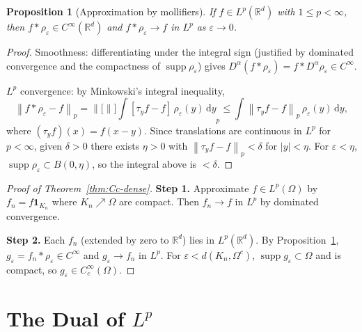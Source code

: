 \documentclass[a4paper,12pt]{book}
\DeclareMathOperator{\supp}{supp}
\newcommand{\R}{\mathbb{R}}
\newcommand{\dd}{\mathrm{d}}
\newcommand{\norm}[1]{\left\| #1 \right\|}
\newcommand{\abs}[1]{\left| #1 \right|}
\theoremstyle{definition}
\theoremstyle{plain}
\newtheorem{proposition}[definition]{Proposition}
\theoremstyle{remark}
\begin{document}
\begin{proposition}[Approximation by mollifiers]\label{prop:mollifier-approx}
If $f \in L^p(\R^d)$ with $1 \le p < \infty$, then
$f * \rho_\varepsilon \in C^\infty(\R^d)$ and
$f * \rho_\varepsilon \to f$ in $L^p$ as $\varepsilon \to 0$.
\end{proposition}

\begin{proof}
Smoothness: differentiating under the integral sign (justified by dominated
convergence and the compactness of $\supp\rho_\varepsilon$) gives
$D^\alpha(f * \rho_\varepsilon) = f * D^\alpha\rho_\varepsilon \in C^\infty$.

$L^p$ convergence: by Minkowski's integral inequality,
\[
  \norm{f * \rho_\varepsilon - f}_p
  = \norm[\bigg]{\int [\tau_y f - f]\, \rho_\varepsilon(y)\, \dd y}_p
  \le \int \norm{\tau_y f - f}_p\, \rho_\varepsilon(y)\, \dd y,
\]
where $(\tau_y f)(x) = f(x - y)$. Since translations are continuous in $L^p$
for $p < \infty$, given $\delta > 0$ there exists $\eta > 0$ with
$\norm{\tau_y f - f}_p < \delta$ for $\abs{y} < \eta$. For
$\varepsilon < \eta$, $\supp\rho_\varepsilon \subset B(0,\eta)$, so the
integral above is $< \delta$.
\end{proof}

\begin{proof}[Proof of Theorem~\ref{thm:Cc-dense}]
\textbf{Step 1.} Approximate $f \in L^p(\Omega)$ by $f_n = f\mathbf{1}_{K_n}$
where $K_n \nearrow \Omega$ are compact. Then $f_n \to f$ in $L^p$ by dominated
convergence.

\textbf{Step 2.} Each $f_n$ (extended by zero to $\R^d$) lies in $L^p(\R^d)$.
By Proposition~\ref{prop:mollifier-approx},
$g_\varepsilon = f_n * \rho_\varepsilon \in C^\infty$ and
$g_\varepsilon \to f_n$ in $L^p$. For $\varepsilon < d(K_n, \Omega^c)$,
$\supp g_\varepsilon \subset \Omega$ and is compact, so
$g_\varepsilon \in C_c^\infty(\Omega)$.
\end{proof}


\section{The Dual of $L^p$}\label{sec:Lp-dual}

\end{document}
